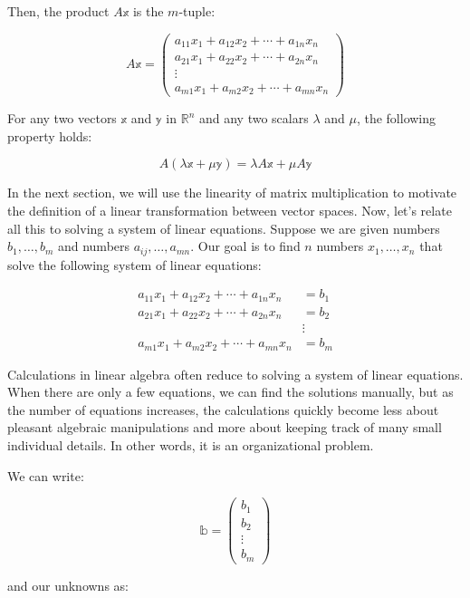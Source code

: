 \documentclass[
]{book}
\theoremstyle{definition}
\theoremstyle{definition}
\theoremstyle{definition}
\theoremstyle{definition}
\theoremstyle{remark}
\begin{document}
Then, the product \(A \mathbb{x}\) is the \(m\)-tuple:

\[
A \mathbb{x} = \begin{pmatrix}
a_{11}x_1 + a_{12}x_2 + \cdots + a_{1n}x_n \\
a_{21}x_1 + a_{22}x_2 + \cdots + a_{2n}x_n \\
\vdots \\
a_{m1}x_1 + a_{m2}x_2 + \cdots + a_{mn}x_n
\end{pmatrix}
\]

For any two vectors \(\mathbb{x}\) and \(\mathbb{y}\) in \(\mathbb{R}^n\) and any two scalars \(\lambda\) and \(\mu\), the following property holds:

\[
A (\lambda \mathbb{x} + \mu \mathbb{y}) = \lambda A \mathbb{x}  + \mu A \mathbb{y}
\]

In the next section, we will use the linearity of matrix multiplication to motivate the definition of a linear transformation between vector spaces. Now, let's relate all this to solving a system of linear equations. Suppose we are given numbers \(b_1, \ldots, b_m\) and numbers \(a_{ij}, \ldots, a_{mn}\). Our goal is to find \(n\) numbers \(x_1, \ldots, x_n\) that solve the following system of linear equations:

\[
\begin{aligned}
a_{11}x_1 + a_{12}x_2 + \cdots + a_{1n}x_n &= b_1 \\
a_{21}x_1 + a_{22}x_2 + \cdots + a_{2n}x_n &= b_2 \\
&\vdots \\
a_{m1}x_1 + a_{m2}x_2 + \cdots + a_{mn}x_n &= b_m
\end{aligned}
\]

Calculations in linear algebra often reduce to solving a system of linear equations. When there are only a few equations, we can find the solutions manually, but as the number of equations increases, the calculations quickly become less about pleasant algebraic manipulations and more about keeping track of many small individual details. In other words, it is an organizational problem.

We can write:

\[
\mathbb{b} = \begin{pmatrix} b_1 \\ b_2 \\ \vdots \\ b_m \end{pmatrix}
\]

and our unknowns as:
\end{document}

